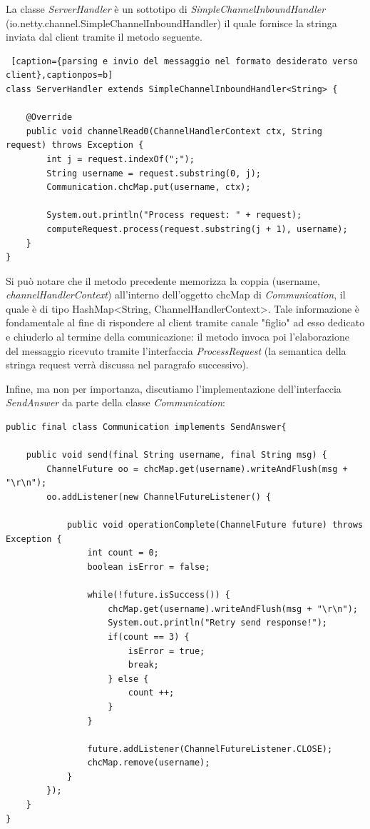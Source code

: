 La classe \textit{ServerHandler} è un sottotipo di \textit{SimpleChannelInboundHandler} \\(io.netty.channel.SimpleChannelInboundHandler) il quale fornisce la stringa inviata dal client tramite il metodo seguente.

\begin{lstlisting} [caption={parsing e invio del messaggio nel formato desiderato verso client},captionpos=b]
class ServerHandler extends SimpleChannelInboundHandler<String> {
	
	@Override
	public void channelRead0(ChannelHandlerContext ctx, String request) throws Exception {
		int j = request.indexOf(";");
		String username = request.substring(0, j);
		Communication.chcMap.put(username, ctx);
		
		System.out.println("Process request: " + request);
		computeRequest.process(request.substring(j + 1), username);
	}
}
\end{lstlisting}

Si può notare che il metodo precedente memorizza la coppia (username, \textit{channelHandlerContext}) all'interno dell'oggetto chcMap di \textit{Communication}, il quale è di tipo HashMap<String, ChannelHandlerContext>.
Tale informazione è fondamentale al fine di rispondere al client tramite canale "figlio" ad esso dedicato e chiuderlo al termine della comunicazione: il metodo invoca poi l'elaborazione del messaggio ricevuto tramite l'interfaccia \textit{ProcessRequest} (la semantica della stringa request verrà discussa nel paragrafo successivo).

\newpage
Infine, ma non per importanza, discutiamo l'implementazione dell'interfaccia \textit{SendAnswer} da parte della classe \textit{Communication}:
\begin{lstlisting}[caption={My Caption},captionpos=b]
public final class Communication implements SendAnswer{

	public void send(final String username, final String msg) {	
		ChannelFuture oo = chcMap.get(username).writeAndFlush(msg + "\r\n");
		oo.addListener(new ChannelFutureListener() {
		
			public void operationComplete(ChannelFuture future)	throws Exception {
				int count = 0;
				boolean isError = false;
				
				while(!future.isSuccess()) {
					chcMap.get(username).writeAndFlush(msg + "\r\n");
					System.out.println("Retry send response!");
					if(count == 3) {
						isError = true;
						break;
					} else {
						count ++;
					}
				}
				
				future.addListener(ChannelFutureListener.CLOSE);
				chcMap.remove(username);
			}
		});
	}
}
\end{lstlisting}

